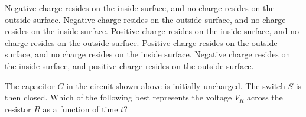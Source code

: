 \documentclass[12pt]{../../oss-classkick-exam}
\begin{document}
\begin{questions}
  \vspace{.1in}\begin{minipage}{.3\linewidth}
  \end{minipage}
  \begin{minipage}{.69\linewidth}
    \begin{choices}
      \choice Negative charge resides on the inside surface, and no charge
      resides on the outside surface.
      \choice Negative charge resides on the outside surface, and no charge
      resides on the inside surface.
      \choice Positive charge resides on the inside surface, and no charge
      resides on the outside surface.
      \choice Positive charge resides on the outside surface, and no charge
      resides on the inside surface.
      \choice Negative charge resides on the inside surface, and positive charge
      resides on the outside surface.
    \end{choices}
  \end{minipage}
  \vspace{.6in}
  
  \question The capacitor $C$ in the circuit shown above is initially
  uncharged. The switch $S$ is then closed. Which of the following best
  represents the voltage $V_R$ across the resistor $R$ as a function of time
  $t$?
  
  \begin{oneparchoices}
    \choice
    \hspace{-.2in}

    \choice
    \hspace{-.2in}


\end{oneparchoices}
\end{questions}
\end{document}
